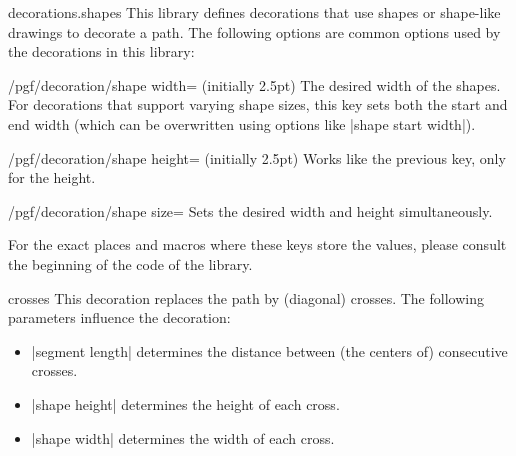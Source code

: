 \begin{pgflibrary}{decorations.shapes}
    This library defines decorations that use shapes or shape-like drawings to
    decorate a path. The following options are common options used by the
    decorations in this library:

    \begin{key}{/pgf/decoration/shape width= (initially 2.5pt)}
        The desired width of the shapes. For decorations that support varying
        shape sizes, this key sets both the start and end width (which can be
        overwritten using options like |shape start width|).
    \end{key}

    \begin{key}{/pgf/decoration/shape height= (initially 2.5pt)}
        Works like the previous key, only for the height.
    \end{key}

    \begin{key}{/pgf/decoration/shape size=}
        Sets the desired width and height simultaneously.
    \end{key}

    For the exact places and macros where these keys store the values, please
    consult the beginning of the code of the library.
\end{pgflibrary}

\begin{decoration}{crosses}
    This decoration replaces the path by (diagonal) crosses. The following
    parameters influence the decoration:
    \begin{itemize}
        \item |segment length| determines the distance between (the centers of)
            consecutive crosses.
        \item |shape height| determines the height of each cross.
        \item |shape width| determines the width of each cross.
    \end{itemize}
\begin{codeexample}[preamble={\usetikzlibrary{decorations.shapes}}]
\end{codeexample}
\end{decoration}

